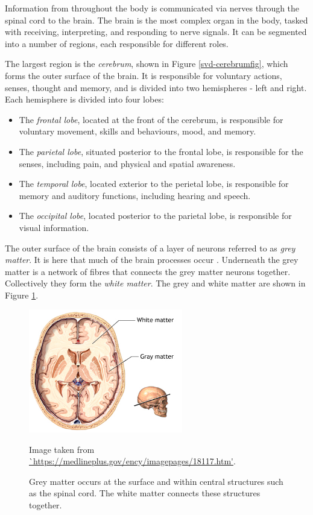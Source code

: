 Information from throughout the body is communicated via nerves through the spinal cord to the brain. The brain is the most complex organ in the body, tasked with receiving, interpreting, and responding to nerve signals. It can be segmented into a number of regions, each responsible for different roles.

The largest region is the \textit{cerebrum}, shown in Figure \ref{svd-cerebrumfig}, which forms the outer surface of the brain. It is responsible for voluntary actions, senses, thought and memory, and is divided into two hemispheres - left and right. Each hemisphere is divided into four lobes:
 \begin{itemize}
	\item The \textit{frontal lobe}, located at the front of the cerebrum, is responsible for voluntary movement, skills and behaviours, mood, and memory.
	\item The \textit{parietal lobe}, situated posterior to the frontal lobe, is responsible for the senses, including pain, and physical and spatial awareness.
	\item The \textit{temporal lobe}, located exterior to the perietal lobe, is responsible for memory and auditory functions, including hearing and speech.
	\item The \textit{occipital lobe}, located posterior to the parietal lobe, is responsible for visual information.
\end{itemize}

The outer surface of the brain consists of a layer of neurons referred to as \textit{grey matter}. It is here that much of the brain processes occur \cite{Dafny1997}. Underneath the grey matter is a network of fibres that connects the grey matter neurons together. Collectively they form the \textit{white matter}. The grey and white matter are shown in Figure \ref{svd-greywhitefig}.

\begin{figure}[ht]
	\centering
	\includegraphics[width=0.6\textwidth]{Images/2_white_vs_grey.png}
	\caption{Grey matter occurs at the surface and within central structures such as the spinal cord. The white matter connects these structures together.}
	\small Image taken from \url{`https://medlineplus.gov/ency/imagepages/18117.htm'}.
	\label{svd-greywhitefig}
\end{figure}

